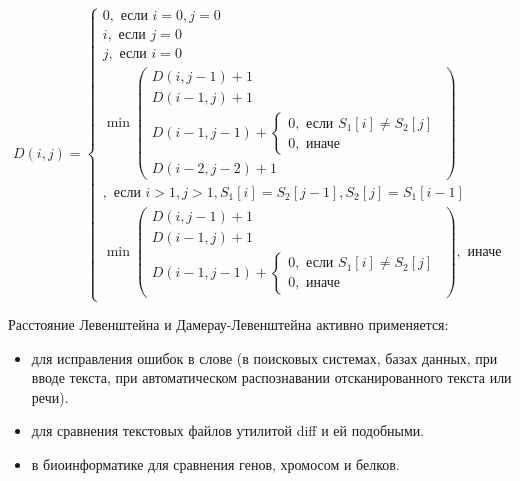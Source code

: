 \documentclass[a4paper,12pt]{article}
\begin{document}
\begin{equation}
D(i,j) =
\begin{cases}
    0, \text{ если } i = 0, j = 0 \\
    i, \text{ если } j = 0 \\
    j, \text{ если } i = 0 \\

    \min
    \left(
        \begin{matrix}
            D(i, j - 1) + 1 \\
            D(i - 1, j) + 1 \\
            D(i - 1, j - 1) +
            \begin{cases}
                0, \text{ если } S_1[i] \ne S_2[j] \\
                0, \text{ иначе}
            \end{cases} \\
            D(i - 2, j - 2) + 1
        \end{matrix}
    \right) \\
    , \text{ если } i > 1, j > 1, S_1[i] = S_2[j - 1], S_2[j] = S_1[i - 1] \\

    \min
    \left(
    \begin{matrix}
        D(i, j - 1) + 1 \\
        D(i - 1, j) + 1 \\
        D(i - 1, j - 1) +
        \begin{cases}
            0, \text{ если } S_1[i] \ne S_2[j] \\
            0, \text{ иначе}
        \end{cases}
    \end{matrix}
    \right)
    , \text{ иначе}
\end{cases}
\end{equation}

Расстояние Левенштейна и Дамерау-Левенштейна активно применяется:

\begin{itemize}
    \item для исправления ошибок в слове (в поисковых системах, базах
        данных, при вводе текста, при автоматическом распознавании
        отсканированного текста или речи).

    \item для сравнения текстовых файлов утилитой diff и ей подобными.

    \item в биоинформатике для сравнения генов, хромосом и белков.
\end{itemize}
\end{document}
